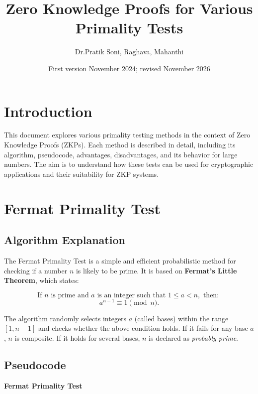\documentclass[12pt]{article}
\title{Zero Knowledge Proofs for Various Primality Tests}
\author{Dr.Pratik Soni, Raghava, Mahanthi}
\date{First version November 2024; revised November 2026}
\begin{document}
\maketitle

\tableofcontents

\newpage

\section{Introduction}

This document explores various primality testing methods in the context of Zero Knowledge Proofs (ZKPs). Each method is described in detail, including its algorithm, pseudocode, advantages, disadvantages, and its behavior for large numbers. The aim is to understand how these tests can be used for cryptographic applications and their suitability for ZKP systems.

\section{Fermat Primality Test}

\subsection*{Algorithm Explanation}

The Fermat Primality Test is a simple and efficient probabilistic method for checking if a number \( n \) is likely to be prime. It is based on \textbf{Fermat's Little Theorem}, which states:

\[
\text{If } n \text{ is prime and } a \text{ is an integer such that } 1 \leq a < n, \text{ then: }
\]
\[
a^{n-1} \equiv 1 \pmod{n}.
\]

The algorithm randomly selects integers \( a \) (called bases) within the range \( [1, n-1] \) and checks whether the above condition holds. If it fails for any base \( a \), \( n \) is composite. If it holds for several bases, \( n \) is declared as \emph{probably prime}.

\subsection*{Pseudocode}

\textbf{Fermat Primality Test}

\end{document}
